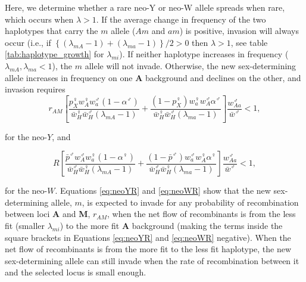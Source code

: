 \documentclass[12pt]{article}
\begin{document}
Here, we determine whether a rare neo-Y or neo-W allele spreads when rare, which occurs when $\lambda > 1$. 
If the average change in frequency of the two haplotypes that carry the $m$ allele ($Am$ and $am$) is positive, invasion will always occur (i.e., if $\left\{(\lambda_{mA}-1)+ (\lambda_{ma}-1) \right\}/2 > 0$ then $\lambda > 1$, see table \ref{tab:haplotype_growth} for $\lambda_{mi}$). 
If neither haplotype increases in frequency ($\lambda_{mA}, \lambda_{ma} < 1$), the $m$ allele will not invade. 
Otherwise, the new sex-determining allele increases in frequency on one \textbf{A} background and declines on the other, and invasion requires
\begin{equation}\label{eq:neoYR}
r_{AM} \left[ 
\frac{p^\female_X w^\female_A w^\male_a (1-\alpha^\male)}{ \bar{w}^\female_H \bar{w}^\male_H (\lambda_{mA}-1)} + 
\frac{(1 - p^\female_X) w^\female_a w^\male_A \alpha^\male}{ \bar{w}^\female_H \bar{w}^\male_H (\lambda_{ma}-1)} 
\right] 
\frac{w^\male_{Aa}}{\bar{w}^\male} < 1,
\end{equation}

\noindent
for the neo-$Y$, and 

\noindent
\begin{equation}\label{eq:neoWR}
R \left[ 
\frac{\bar{p}^\male w^\male_A w^\female_a (1-\alpha^\female)}{ \bar{w}^\male_H \bar{w}^\female_H (\lambda_{mA}-1)} + 
\frac{(1 - \bar{p}^\male) w^\male_a w^\female_A \alpha^\female}{ \bar{w}^\male_H \bar{w}^\female_H (\lambda_{ma}-1)} 
\right] 
\frac{w^\male_{Aa}}{\bar{w}^\male} < 1,
\end{equation}

\noindent
for the neo-$W$. Equations \eqref{eq:neoYR} and \eqref{eq:neoWR} show that the new sex-determining allele, $m$, is expected to invade for any probability of recombination between loci \textbf{A} and \textbf{M}, $r_{AM}$, when the net flow of recombinants is from the less fit (smaller $\lambda_{mi}$) to the more fit \textbf{A} background (making the terms inside the square brackets in Equations \ref{eq:neoYR} and \ref{eq:neoWR} negative). %
When the net flow of recombinants is from the more fit to the less fit haplotype, the new sex-determining allele can still invade when the rate of recombination between it and the selected locus is small enough. %
\end{document}
